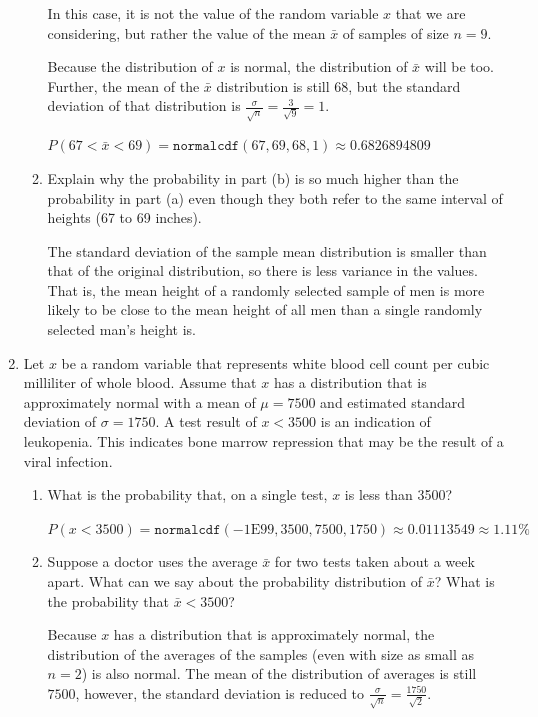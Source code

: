 \documentclass{article}
\newcommand{\answer}[1]{\color{red}#1}
\begin{document}
\begin{enumerate}
\begin{enumerate}
	{\answer  In this case, it is not the value of the random variable $x$ that we are considering, but rather the value of the mean $\bar{x}$ of samples of size $n = 9$.  
	
	Because the distribution of $x$ is normal, the distribution of $\bar{x}$ will be too.  Further, the mean of the $\bar{x}$ distribution is still 68, but the standard deviation of that distribution is $\frac{\sigma}{\sqrt{n}} = \frac{3}{\sqrt{9}} = 1$. 
	
	$P(67 < \bar{x} < 69) = \texttt{normalcdf}(67, 69, 68, 1) \approx 0.6826894809$
	} 

	\item Explain why the probability in part (b) is so much higher than the probability in part (a) even though they both refer to the same interval of heights (67 to 69 inches). 
	
	{\answer The standard deviation of the sample mean distribution is smaller than that of the original distribution, so there is less variance in the values.  That is, the mean height of a randomly selected sample of men is more likely to be close to the mean height of all men than a single randomly selected man's height is.
	} 
	\end{enumerate}

\pagebreak	
	
\item Let $x$ be a random variable that represents white blood cell count per cubic milliliter of whole blood.  Assume that $x$ has a distribution that is approximately normal with a mean of $\mu = 7500$ and estimated standard deviation of $\sigma = 1750$.  A test result of $x<3500$ is an indication of leukopenia.  This indicates bone marrow repression that may be the result of a viral infection.

	\begin{enumerate}
	
	\item What is the probability that, on a single test, $x$ is less than 3500? 
	
	{\answer $P(x<3500) = \texttt{normalcdf}(-1\mbox{E}99, 3500, 7500, 1750) \approx 0.01113549 \approx 1.11\%$
	} 

	\item Suppose a doctor uses the average $\bar x$ for two tests taken about a week apart.  What can we say about the probability distribution of $\bar x$?  What is the probability that $\bar x < 3500$? 
	
	{\answer Because $x$ has a distribution that is approximately normal, the distribution of the averages of the samples (even with size as small as $n=2$) is also normal.  The mean of the distribution of averages is still $7500$, however, the standard deviation is reduced to $\frac{\sigma}{\sqrt{n}} = \frac{1750}{\sqrt{2}}.$ 
	
}
\end{enumerate}
\end{enumerate}
\end{document}
